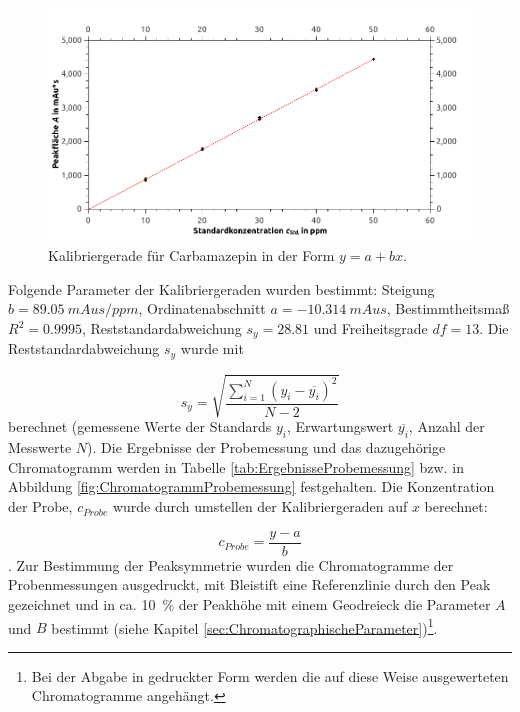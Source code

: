       \begin{figure}[H]
        \includegraphics[scale=0.4, center]{images/Kalibriergerade.png} 
        \caption[Kalibriergerade für Carbamazepin, Quelle: Autor]{Kalibriergerade für Carbamazepin in der Form $y = a + bx$.}
        \label{fig:KalibriergeradeCarbamazepin}
      \end{figure}
    \noindent Folgende Parameter der Kalibriergeraden wurden bestimmt: Steigung $b = \SI[mode=text]{89.05}{mAus\per ppm}$, Ordinatenabschnitt $a = \SI[mode=text]{-10.314}{mAus}$, Bestimmtheitsmaß $R^2 = 0.9995$, Reststandardabweichung $s_y = 28.81$ und Freiheitsgrade $df = 13$. Die Reststandardabweichung $s_y$ wurde mit 
    
      \begin{equation}
        s_y = \sqrt{\frac{\sum_{i=1}^N \left(y_i - \overline{y_i}\right)^2}{N-2}}
      \end{equation}
    berechnet (gemessene Werte der Standards $y_i$, Erwartungswert $\overline{y_i}$, Anzahl der Messwerte $N$). Die Ergebnisse der Probemessung und das dazugehörige Chromatogramm werden in Tabelle \ref{tab:ErgebnisseProbemessung} bzw. in Abbildung \ref{fig:ChromatogrammProbemessung} festgehalten. Die Konzentration der Probe, $c_{Probe}$ wurde durch umstellen der Kalibriergeraden auf $x$ berechnet:
    
      \begin{equation}
        c_{Probe} = \frac{y - a}{b}
      \end{equation}.
    Zur Bestimmung der Peaksymmetrie wurden die Chromatogramme der Probenmessungen ausgedruckt, mit Bleistift eine Referenzlinie durch den Peak gezeichnet und in ca. \SI[mode=text]{10}{\percent} der Peakhöhe mit einem Geodreieck die Parameter $A$ und $B$ bestimmt (siehe Kapitel \ref{sec:ChromatographischeParameter})\footnote{Bei der Abgabe in gedruckter Form werden die auf diese Weise ausgewerteten Chromatogramme angehängt.}. 
    
